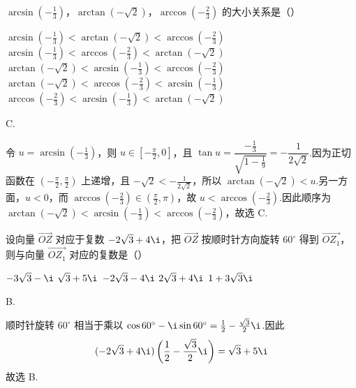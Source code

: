 \documentclass[UTF8,a4paper,oneside,11pt]{ctexbook}
\begin{document}
\begin{problem}

\(\arcsin\left(-\frac{1}{3}\right)\)，\(\arctan\left(-\sqrt{2}\right)\)，\(\arccos\left(-\frac{2}{3}\right)\) 的大小关系是（\quad）

\choicesfive
    {\(\arcsin\left(-\frac{1}{3}\right)<\arctan\left(-\sqrt{2}\right)<\arccos\left(-\frac{2}{3}\right) \)}
    {\(\arcsin\left(-\frac{1}{3}\right)<\arccos\left(-\frac{2}{3}\right)<\arctan\left(-\sqrt{2}\right) \)}
    {\(\arctan\left(-\sqrt{2}\right)<\arcsin\left(-\frac{1}{3}\right)<\arccos\left(-\frac{2}{3}\right) \)}
    {\(\arctan\left(-\sqrt{2}\right)<\arccos\left(-\frac{2}{3}\right)<\arcsin\left(-\frac{1}{3}\right) \)}
    {\(\arccos\left(-\frac{2}{3}\right)<\arcsin\left(-\frac{1}{3}\right)<\arctan\left(-\sqrt{2}\right) \)}
\end{problem}

\begin{answer}
C.
\end{answer}

\begin{solution}
令 \(u=\arcsin(-\frac13)\)，则 \(u\in[-\frac\pi2,0]\)，且 \(\tan u=\dfrac{-\frac{1}{3}}{\sqrt{1-\frac{1}{9}}}=-\dfrac{1}{2\sqrt2}\).因为正切函数在 \((-\frac\pi2,\frac\pi2)\) 上递增，且 \(-\sqrt2< -\frac{1}{2\sqrt2}\)，所以 \(\arctan(-\sqrt2)<u\).另一方面，\(u<0\)，而 \(\arccos(-\frac23)\in(\frac\pi2,\pi)\)，故 \(u<\arccos(-\frac23)\).因此顺序为 \(\arctan(-\sqrt2)<\arcsin(-\frac13)<\arccos(-\frac23)\)，故选 C.
\end{solution}

\begin{problem}

设向量 \(\overrightarrow{OZ} \) 对应于复数 \(-2\sqrt{3} + 4\i \)，把 \(\overrightarrow{OZ} \) 按顺时针方向旋转 \(60^\circ \) 得到 \(\overrightarrow{OZ_1} \)，则与向量 \(\overrightarrow{OZ_1} \) 对应的复数是（\quad）

\choicesfive
    {\(-3\sqrt{3}-\i \)}
    {\(\sqrt{3}+5\i \)}
    {\(-2\sqrt{3}-4\i \)}
    {\(2\sqrt{3} + 4\i \)}
    {\(1 + 3\sqrt{3}\i \)}
\end{problem}

\begin{answer}
B.
\end{answer}

\begin{solution}
顺时针旋转 \(60^\circ\) 相当于乘以 \(\cos60^\circ-\i\sin60^\circ=\frac12-\frac{\sqrt3}{2}\i\).因此
\[
(-2\sqrt3+4\i)\left(\frac12-\frac{\sqrt3}{2}\i\right)=\sqrt3+5\i
\]
故选 B.
\end{solution}
\end{document}
